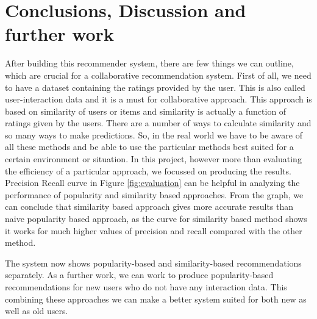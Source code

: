 \documentclass{jot}
\begin{document}
\section{Conclusions, Discussion and further work}

After building this recommender system, there are few things we can outline, which are crucial for a collaborative recommendation system. First of all, we need to have a dataset containing the ratings provided by the user. This is also called user-interaction data and it is a must for collaborative approach. This approach is based on similarity of users or items and similarity is actually a function of ratings given by the users. There are a number of ways to calculate similarity and so many ways to make predictions. So, in the real world we have to be aware of all these methods and be able to use the particular methods best suited for a certain environment or situation. In this project, however more than evaluating the efficiency of a particular approach, we focussed on producing the results.\\

Precision Recall curve in Figure \ref{fig:evaluation} can be helpful in analyzing the performance of popularity and similarity based approaches. From the graph, we can conclude that similarity based approach gives more accurate results than naive popularity based approach, as the curve for similarity based method shows it works for much higher values of precision and recall compared with the other method.

The system now shows popularity-based and similarity-based recommendations separately. As a further work, we can work to produce popularity-based recommendations for new users who do not have any interaction data. This combining these approaches we can make a better system suited for both new as well as old users.

\backmatter

\nocite{*}



\abouttheauthors
\end{document}
